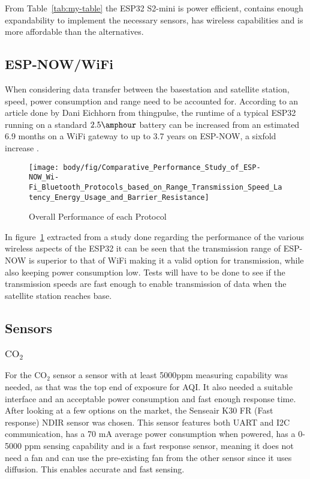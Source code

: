 \noindent
From Table~\ref{tab:my-table} the ESP32 S2-mini is power efficient, contains enough expandability to implement the necessary sensors, has wireless capabilities and is more affordable than the alternatives.


\subsection{ESP-NOW/WiFi}
When considering data transfer between the basestation and satellite station, speed, power consumption and range need to be accounted for.
According to an article done by Dani Eichhorn from thingpulse, the runtime of a typical ESP32 running on a standard $ 2.5\si{\amphour} $ battery
can be increased from an estimated 6.9 months on a WiFi gateway to up to 3.7 years on ESP-NOW, a sixfold increase \cite{wifiespnow}.
\begin{figure}[!htb]
	\centering
	\texttt{[image: body/fig/Comparative\_Performance\_Study\_of\_ESP-NOW\_Wi-Fi\_Bluetooth\_Protocols\_based\_on\_Range\_Transmission\_Speed\_Latency\_Energy\_Usage\_and\_Barrier\_Resistance]}
	\caption{Overall Performance of each Protocol}
	\label{fig:cmp}
\end{figure}

\noindent
In figure~\ref{fig:cmp} extracted from a study done regarding the performance of the various wireless aspects of the ESP32\cite{esprange} it can be seen that the transmission range of ESP-NOW is superior to that of WiFi making it a valid option for transmission, while also keeping power consumption low. Tests will have to be done to see if the transmission speeds are fast enough to enable transmission of data when the satellite station reaches base. 


\subsection{Sensors}
\subsubsection{$\mathrm{CO_2}$}
For the $\mathrm{CO_2}$ sensor a sensor with at least 5000ppm measuring capability was needed, as that was the top end of exposure for AQI. It also needed a suitable interface and an acceptable power consumption and fast enough response time.
After looking at a few options on the market, the Senseair K30 FR (Fast response) NDIR sensor was chosen. This sensor features both UART and I2C communication, has a 70 mA average power consumption when powered, has a 0-5000 ppm sensing capability and is a fast response sensor, meaning it does not need a fan and can use the pre-existing fan from the other sensor since it uses diffusion. This enables accurate and fast sensing.
